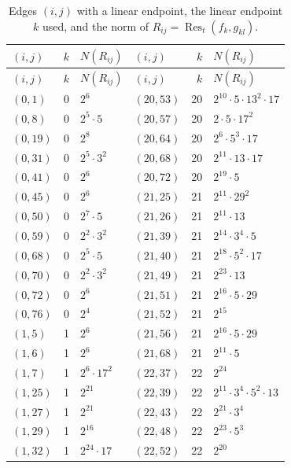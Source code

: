 \documentclass[11pt]{article}
\begin{document}
\begingroup\small
\setlength{\LTcapwidth}{\textwidth}
\begin{longtable}{@{}lrl@{\qquad}lrl@{}}
\caption{Edges $(i,j)$ with a linear endpoint, the linear endpoint $k$ used, and the norm of $R_{ij}=\operatorname{Res}_t(f_k,g_{kl})$.}\label{tab:sep}\\
\hline $(i,j)$ & $k$ & $N(R_{ij})$ & $(i,j)$ & $k$ & $N(R_{ij})$\\\hline\endfirsthead\hline $(i,j)$ & $k$ & $N(R_{ij})$ & $(i,j)$ & $k$ & $N(R_{ij})$\\\hline\endhead\hline\endfoot
$(0,1)$ & 0 & $2^{6}$ & $(20,53)$ & 20 & $2^{10}\cdot 5\cdot 13^{2}\cdot 17$\\
$(0,8)$ & 0 & $2^{5}\cdot 5$ & $(20,57)$ & 20 & $2\cdot 5\cdot 17^{2}$\\
$(0,19)$ & 0 & $2^{8}$ & $(20,64)$ & 20 & $2^{6}\cdot 5^{3}\cdot 17$\\
$(0,31)$ & 0 & $2^{5}\cdot 3^{2}$ & $(20,68)$ & 20 & $2^{11}\cdot 13\cdot 17$\\
$(0,41)$ & 0 & $2^{6}$ & $(20,72)$ & 20 & $2^{19}\cdot 5$\\
$(0,45)$ & 0 & $2^{6}$ & $(21,25)$ & 21 & $2^{11}\cdot 29^{2}$\\
$(0,50)$ & 0 & $2^{7}\cdot 5$ & $(21,26)$ & 21 & $2^{11}\cdot 13$\\
$(0,59)$ & 0 & $2^{2}\cdot 3^{2}$ & $(21,39)$ & 21 & $2^{14}\cdot 3^{4}\cdot 5$\\
$(0,68)$ & 0 & $2^{5}\cdot 5$ & $(21,40)$ & 21 & $2^{18}\cdot 5^{2}\cdot 17$\\
$(0,70)$ & 0 & $2^{2}\cdot 3^{2}$ & $(21,49)$ & 21 & $2^{23}\cdot 13$\\
$(0,72)$ & 0 & $2^{6}$ & $(21,51)$ & 21 & $2^{16}\cdot 5\cdot 29$\\
$(0,76)$ & 0 & $2^{4}$ & $(21,52)$ & 21 & $2^{15}$\\
$(1,5)$ & 1 & $2^{6}$ & $(21,56)$ & 21 & $2^{16}\cdot 5\cdot 29$\\
$(1,6)$ & 1 & $2^{6}$ & $(21,68)$ & 21 & $2^{11}\cdot 5$\\
$(1,7)$ & 1 & $2^{6}\cdot 17^{2}$ & $(22,37)$ & 22 & $2^{24}$\\
$(1,25)$ & 1 & $2^{21}$ & $(22,39)$ & 22 & $2^{11}\cdot 3^{4}\cdot 5^{2}\cdot 13$\\
$(1,27)$ & 1 & $2^{21}$ & $(22,43)$ & 22 & $2^{21}\cdot 3^{4}$\\
$(1,29)$ & 1 & $2^{16}$ & $(22,48)$ & 22 & $2^{23}\cdot 5^{3}$\\
$(1,32)$ & 1 & $2^{24}\cdot 17$ & $(22,52)$ & 22 & $2^{20}$\\

\end{longtable}
\end{document}
